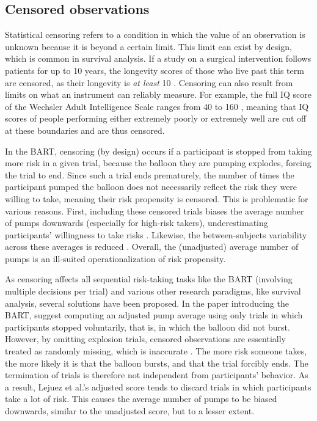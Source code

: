 \documentclass[serif, twocolumn, authordate, meta]{jote-article}
\begin{document}
{}\subsection*{Censored observations}

Statistical censoring refers to a condition in which the value of an observation is unknown because it is beyond a certain limit. This limit can exist by design, which is common in survival analysis. If a study on a surgical intervention follows patients for up to 10 years, the longevity scores of those who live past this term are censored, as their longevity is \emph{at least} 10 \parencite{Young2019}. Censoring can also result from limits on what an instrument can reliably measure. For example, the full IQ score of the Wechsler Adult Intelligence Scale ranges from 40 to 160 \parencite{Sattler2009}, meaning that IQ scores of people performing either extremely poorly or extremely well are cut off at these boundaries and are thus censored.

In the BART, censoring (by design) occurs if a participant is stopped from taking more risk in a given trial, because the balloon they are pumping explodes, forcing the trial to end. Since such a trial ends prematurely, the number of times the participant pumped the balloon does not necessarily reflect the risk they were willing to take, meaning their risk propensity is censored. This is problematic for various reasons. First, including these censored trials biases the average number of pumps downwards (especially for high-risk takers), underestimating participants' willingness to take risks \parencite{Dijkstra2020,Pleskac2008}. Likewise, the between-subjects variability across these averages is reduced \parencite{Lejuez2002}. Overall, the (unadjusted) average number of pumps is an ill-suited operationalization of risk propensity.

As censoring affects all sequential risk-taking tasks like the BART (involving multiple decisions per trial) and various other research paradigms, like survival analysis, several solutions have been proposed. In the paper introducing the BART, \textcite{Lejuez2002} suggest computing an adjusted pump average using only trials in which participants stopped voluntarily, that is, in which the balloon did not burst. However, by omitting explosion trials, censored observations are essentially treated as randomly missing, which is inaccurate \parencite{Pleskac2008}. The more risk someone takes, the more likely it is that the balloon bursts, and that the trial forcibly ends. The termination of trials is therefore not independent from participants' behavior. As a result, Lejuez et al.'s adjusted score tends to discard trials in which participants take a lot of risk. This causes the average number of pumps to be biased downwards, similar to the unadjusted score, but to a lesser extent.
\end{document}
